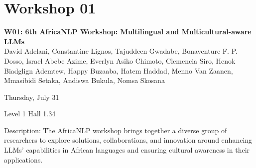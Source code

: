 
\clearpage



\section[W01: 6th AfricaNLP Workshop: Multilingual and Multicultural-aware LLMs]{Workshop 01}
\label{workshop_1}

\begin{center}
    {\Large \textbf{W01: 6th AfricaNLP Workshop: Multilingual and Multicultural-aware LLMs}}\\
    

    David Adelani, Constantine Lignos, Tajuddeen Gwadabe, Bonaventure F. P. Dosso, Israel Abebe Azime, Everlyn Asiko Chimoto, Clemencia Siro, Henok Biadglign Ademtew, Happy Buzaaba, Hatem Haddad, Menno Van Zaanen, Mmasibidi Setaka, Andiswa Bukula, Nomsa Skosana

    Thursday, July 31
    
    Level 1 Hall 1.34

\end{center}

Description: The AfricaNLP workshop brings together a diverse group of researchers to explore solutions, collaborations, and innovation around enhancing LLMs’ capabilities in African languages and ensuring cultural awareness in their applications. 

